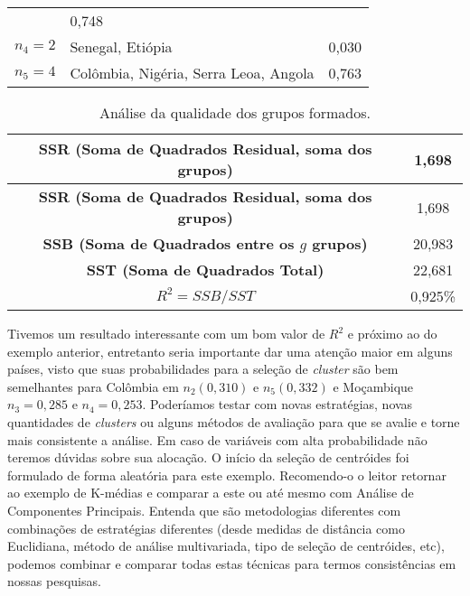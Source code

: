 \documentclass[
]{book}
\begin{document}
\begin{longtable}[]{@{}lll@{}}
\begin{minipage}[t]{0.30\columnwidth}
\end{minipage} & \begin{minipage}[t]{0.30\columnwidth}\raggedright
0,748\strut
\end{minipage}\tabularnewline
\begin{minipage}[t]{0.30\columnwidth}\raggedright
\(n_4=2\)\strut
\end{minipage} & \begin{minipage}[t]{0.30\columnwidth}\raggedright
Senegal, Etiópia\strut
\end{minipage} & \begin{minipage}[t]{0.30\columnwidth}\raggedright
0,030\strut
\end{minipage}\tabularnewline
\begin{minipage}[t]{0.30\columnwidth}\raggedright
\(n_5=4\)\strut
\end{minipage} & \begin{minipage}[t]{0.30\columnwidth}\raggedright
Colômbia, Nigéria, Serra Leoa, Angola\strut
\end{minipage} & \begin{minipage}[t]{0.30\columnwidth}\raggedright
0,763\strut
\end{minipage}\tabularnewline
\bottomrule
\end{longtable}

\begin{longtable}[]{@{}cc@{}}
\caption{\label{tab:exkmeans2} Análise da qualidade dos grupos formados.}\tabularnewline
\toprule
\textbf{SSR (Soma de Quadrados Residual, soma dos grupos)} & 1,698\tabularnewline
\midrule
\endfirsthead
\toprule
\textbf{SSR (Soma de Quadrados Residual, soma dos grupos)} & 1,698\tabularnewline
\midrule
\endhead
\textbf{SSB (Soma de Quadrados entre os \(g\) grupos)} & 20,983\tabularnewline
\textbf{SST (Soma de Quadrados Total)} & 22,681\tabularnewline
\textbf{\(R^2=SSB/SST\)} & 0,925\%\tabularnewline
\bottomrule
\end{longtable}

Tivemos um resultado interessante com um bom valor de \(R^2\) e próximo ao do exemplo anterior, entretanto seria importante dar uma atenção maior em alguns países, visto que suas probabilidades para a seleção de \emph{cluster} são bem semelhantes para Colômbia em \(n_2 (0,310)\) e \(n_5 (0,332)\) e Moçambique \(n_3=0,285\) e \(n_4=0,253\). Poderíamos testar com novas estratégias, novas quantidades de \emph{clusters} ou alguns métodos de avaliação para que se avalie e torne mais consistente a análise. Em caso de variáveis com alta probabilidade não teremos dúvidas sobre sua alocação. O início da seleção de centróides foi formulado de forma aleatória para este exemplo. Recomendo-o o leitor retornar ao exemplo de K-médias e comparar a este ou até mesmo com Análise de Componentes Principais. Entenda que são metodologias diferentes com combinações de estratégias diferentes (desde medidas de distância como Euclidiana, método de análise multivariada, tipo de seleção de centróides, etc), podemos combinar e comparar todas estas técnicas para termos consistências em nossas pesquisas.
\end{document}
